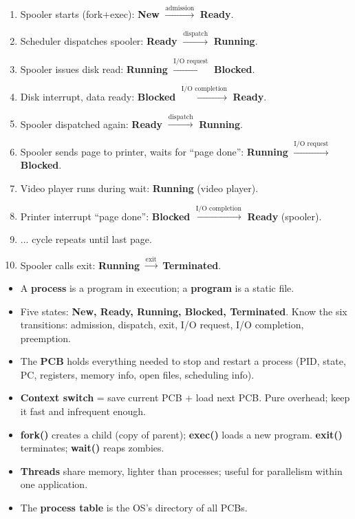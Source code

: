 \documentclass[11pt]{article}
\newcounter{popsec}
\newcounter{popsub}
\newcommand{\courssub}[1]{%
  \stepcounter{popsub}%
  \par\vspace{9pt}\noindent{\popxbold\fontsize{11.5}{13}\selectfont\color{popink}{\color{poporange}\thepopsec.\thepopsub}\hspace{6pt}#1}\par\nopagebreak\vspace{4pt}
}
\begin{document}
\begin{corrige}[Exercise 1]
\begin{enumerate}
\item Spooler starts (fork+exec): \textbf{New} $\xrightarrow{\text{admission}}$ \textbf{Ready}.
\item Scheduler dispatches spooler: \textbf{Ready} $\xrightarrow{\text{dispatch}}$ \textbf{Running}.
\item Spooler issues disk read: \textbf{Running} $\xrightarrow{\text{I/O request}}$ \textbf{Blocked}.
\item Disk interrupt, data ready: \textbf{Blocked} $\xrightarrow{\text{I/O completion}}$ \textbf{Ready}.
\item Spooler dispatched again: \textbf{Ready} $\xrightarrow{\text{dispatch}}$ \textbf{Running}.
\item Spooler sends page to printer, waits for ``page done'': \textbf{Running} $\xrightarrow{\text{I/O request}}$ \textbf{Blocked}.
\item Video player runs during wait: \textbf{Running} (video player).
\item Printer interrupt ``page done'': \textbf{Blocked} $\xrightarrow{\text{I/O completion}}$ \textbf{Ready} (spooler).
\item ... cycle repeats until last page.
\item Spooler calls exit: \textbf{Running} $\xrightarrow{\text{exit}}$ \textbf{Terminated}.
\end{enumerate}
\end{corrige}

\courssub{Key Points to Retain}

\begin{aretenir}
\begin{itemize}
\item A \textbf{process} is a program in execution; a \textbf{program} is a static file.
\item Five states: \textbf{New, Ready, Running, Blocked, Terminated}. Know the six transitions: admission, dispatch, exit, I/O request, I/O completion, preemption.
\item The \textbf{PCB} holds everything needed to stop and restart a process (PID, state, PC, registers, memory info, open files, scheduling info).
\item \textbf{Context switch} = save current PCB + load next PCB. Pure overhead; keep it fast and infrequent enough.
\item \textbf{fork()} creates a child (copy of parent); \textbf{exec()} loads a new program. \textbf{exit()} terminates; \textbf{wait()} reaps zombies.
\item \textbf{Threads} share memory, lighter than processes; useful for parallelism within one application.
\item The \textbf{process table} is the OS's directory of all PCBs.
\end{itemize}
\end{aretenir}
\end{document}

